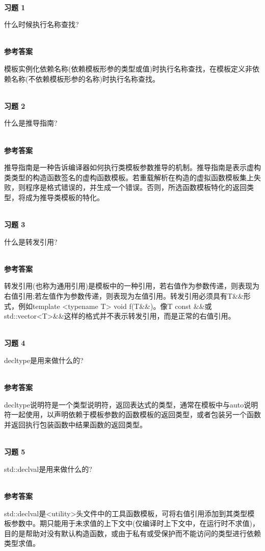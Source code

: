 \hspace*{\fill} \\ %
\noindent
\textbf{习题 1}

什么时候执行名称查找?

\hspace*{\fill} \\ %
\noindent
\textbf{参考答案}

模板实例化依赖名称(依赖模板形参的类型或值)时执行名称查找，在模板定义非依赖名称(不依赖模板形参的名称)时执行名称查找。


\hspace*{\fill} \\ %
\noindent
\textbf{习题 2}

什么是推导指南?

\hspace*{\fill} \\ %
\noindent
\textbf{参考答案}

推导指南是一种告诉编译器如何执行类模板参数推导的机制。推导指南是表示虚构类类型的构造函数签名的虚构函数模板。若重载解析在构造的虚拟函数模板集上失败，则程序是格式错误的，并生成一个错误。否则，所选函数模板特化的返回类型，将成为推导类模板的特化。

\hspace*{\fill} \\ %
\noindent
\textbf{习题 3}

什么是转发引用?

\hspace*{\fill} \\ %
\noindent
\textbf{参考答案}

转发引用(也称为通用引用)是模板中的一种引用，若右值作为参数传递，则表现为右值引用;若左值作为参数传递，则表现为左值引用。转发引用必须具有T\&\&形式，例如template <typename T> void f(T\&\&)。像T const \&\&或std::vector<T>\&\&这样的格式并不表示转发引用，而是正常的右值引用。

\hspace*{\fill} \\ %
\noindent
\textbf{习题 4}

decltype是用来做什么的?

\hspace*{\fill} \\ %
\noindent
\textbf{参考答案}

decltype说明符是一个类型说明符，返回表达式的类型，通常在模板中与auto说明符一起使用，以声明依赖于模板参数的函数模板的返回类型，或者包装另一个函数并返回执行包装函数中结果函数的返回类型。

\hspace*{\fill} \\ %
\noindent
\textbf{习题 5}

std::declval是用来做什么的?

\hspace*{\fill} \\ %
\noindent
\textbf{参考答案}

std::declval是<utility>头文件中的工具函数模板，可将右值引用添加到其类型模板参数中。期只能用于未求值的上下文中(仅编译时上下文中，在运行时不求值)，目的是帮助对没有默认构造函数，或由于私有或受保护而不能访问的类型进行依赖类型求值。












